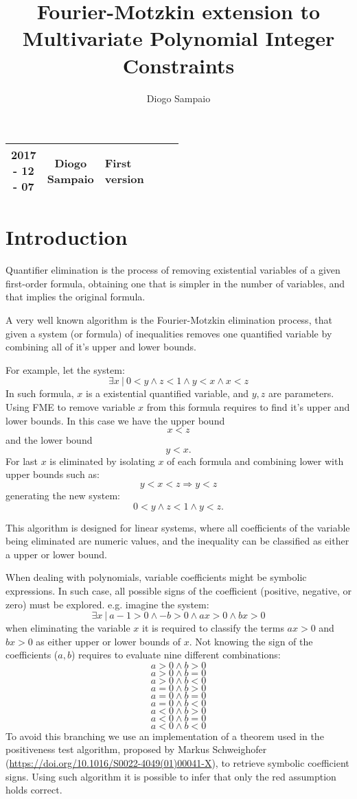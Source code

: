 \documentclass[12pt, a4paper]{report}
\title{Fourier-Motzkin extension to Multivariate Polynomial Integer Constraints}
\author{Diogo Sampaio}
\begin{document}
\maketitle

\begin{tabular}[c]{|c|c|p{0.5\linewidth}|}
	\hline
	2017 - 12 - 07 & Diogo Sampaio & First version\\
	\hline
\end{tabular}

\tableofcontents

\chapter{Introduction}
Quantifier elimination is the process of removing existential variables of a given first-order formula, obtaining one that is simpler in the number of variables, and that implies the original formula.

A very well known algorithm is the Fourier-Motzkin elimination process, that given a system (or formula) of inequalities removes one quantified variable by combining all of it's upper and lower bounds.

For example, let the system:
$$\exists x ~ | ~ 0 < y \land z < 1 \land y < x \land x < z$$
In such formula, $x$ is a existential quantified variable, and $y, z$ are parameters. Using FME to remove variable $x$ from this formula requires to find it's upper and lower bounds. In this case we have the upper bound $$x < z$$ and the lower bound $$y < x.$$ For last $x$ is eliminated by isolating $x$ of each formula and combining lower with upper bounds such as:
$$y < x < z \Rightarrow y < z$$
generating the new system:
$$0 < y \land z < 1 \land y < z.$$

This algorithm is designed for linear systems, where all coefficients of the variable being eliminated are numeric values, and the inequality can be classified as either a upper or lower bound.

When dealing with polynomials, variable coefficients might be symbolic expressions. In such case, all possible signs of the coefficient (positive, negative, or zero) must be explored.
e.g. imagine the system:
$$\exists x ~ | ~ a - 1 > 0 \land -b > 0 \land ax > 0 \land bx > 0$$
when eliminating the variable $x$ it is required to classify the terms $ax > 0$ and $bx > 0$ as either upper or lower bounds of $x$. Not knowing the sign of the coefficients ($a, b$) requires to evaluate nine different combinations:
$$a > 0 \land b > 0$$
$$a > 0 \land b = 0$${\color{red}$$a > 0 \land b < 0$$}$$a = 0 \land b > 0$$
$$a = 0 \land b = 0$$
$$a = 0 \land b < 0$$
$$a < 0 \land b > 0$$
$$a < 0 \land b = 0$$
$$a < 0 \land b < 0$$
To avoid this branching we use an implementation of a theorem used in the positiveness test algorithm, proposed by Markus Schweighofer (\url{https://doi.org/10.1016/S0022-4049(01)00041-X}), to retrieve symbolic coefficient signs. Using such algorithm it is possible to infer that only the red assumption holds correct.
\end{document}
